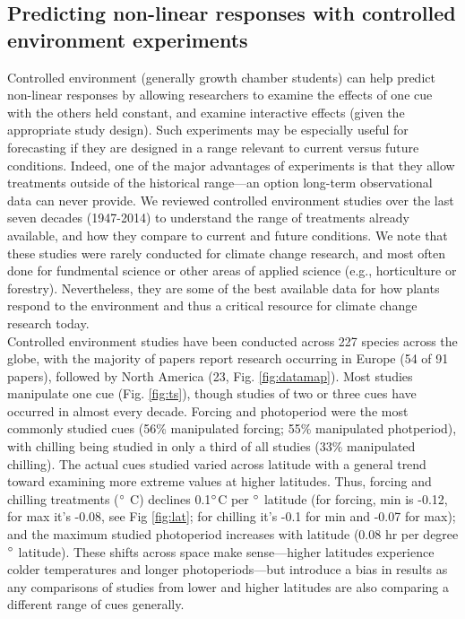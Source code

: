 \documentclass[11pt,letter]{article}
\begin{document}
\subsection{Predicting non-linear responses with controlled environment experiments} %

Controlled environment (generally growth chamber students) can help predict non-linear responses by allowing researchers to examine the effects of one cue with the others held constant, and examine interactive effects (given the appropriate study design). Such experiments may be especially useful for forecasting if they are designed in a range relevant to current versus future conditions. Indeed, one of the major advantages of experiments is that they allow treatments outside of the historical range---an option long-term observational data can never provide. We reviewed controlled environment studies over the last seven decades (1947-2014) to understand the range of treatments already available, and how they compare to current and future conditions. We note that these studies were rarely conducted for climate change research, and most often done for fundmental science or other areas of applied science (e.g., horticulture or forestry). Nevertheless, they are some of the best available data for how plants respond to the environment and thus a critical resource for climate change research today.\\

Controlled environment studies have been conducted across 227 species across the globe, with the majority of papers report research occurring in Europe (54 of 91 papers), followed by North America (23, Fig. \ref{fig:datamap}). Most studies manipulate one cue (Fig. \ref{fig:ts}), though studies of two or three cues have occurred in almost every decade. Forcing and photoperiod were the most commonly studied cues (56\% manipulated forcing; 55\% manipulated photperiod), with chilling being studied in only a third of all studies (33\% manipulated chilling). The actual cues studied varied across latitude with a general trend toward examining more extreme values at higher latitudes. Thus, forcing and chilling treatments ($\degree$ C) declines 0.1$\degree$C per $\degree$ latitude (for forcing, min is -0.12, for max it's -0.08, see Fig \ref{fig:lat}; for chilling it's -0.1 for min and -0.07 for max); and the maximum studied photoperiod increases with latitude (0.08 hr per degree $\degree$ latitude). These shifts across space make sense---higher latitudes experience colder temperatures and longer photoperiods---but introduce a bias in results as any comparisons of studies from lower and higher latitudes are also comparing a different range of cues generally. \\
\end{document}
